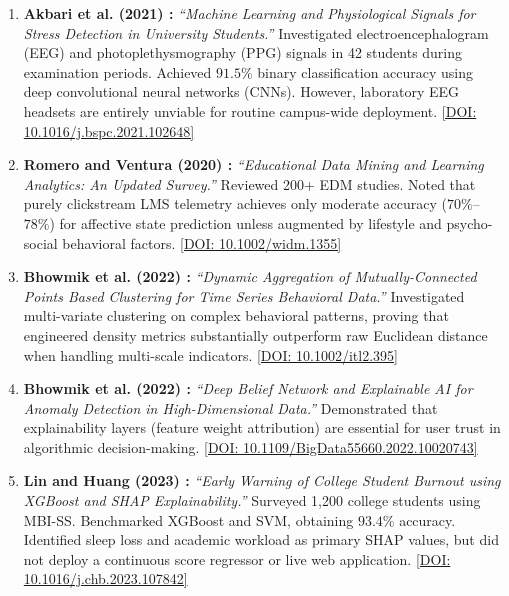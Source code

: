 \documentclass[12pt,a4paper,oneside]{report}
\begin{document}
\begin{enumerate}
    \item \textbf{Akbari et al. (2021) \cite{akbari2021}:} \emph{``Machine Learning and Physiological Signals for Stress Detection in University Students.''} Investigated electroencephalogram (EEG) and photoplethysmography (PPG) signals in 42 students during examination periods. Achieved $91.5\%$ binary classification accuracy using deep convolutional neural networks (CNNs). However, laboratory EEG headsets are entirely unviable for routine campus-wide deployment. \href{https://doi.org/10.1016/j.bspc.2021.102648}{[DOI: 10.1016/j.bspc.2021.102648]}

    \item \textbf{Romero and Ventura (2020) \cite{romero2020}:} \emph{``Educational Data Mining and Learning Analytics: An Updated Survey.''} Reviewed 200+ EDM studies. Noted that purely clickstream LMS telemetry achieves only moderate accuracy ($70\%$--$78\%$) for affective state prediction unless augmented by lifestyle and psycho-social behavioral factors. \href{https://doi.org/10.1002/widm.1355}{[DOI: 10.1002/widm.1355]}

    \item \textbf{Bhowmik et al. (2022) \cite{bhowmik2022dynamite}:} \emph{``Dynamic Aggregation of Mutually-Connected Points Based Clustering for Time Series Behavioral Data.''} Investigated multi-variate clustering on complex behavioral patterns, proving that engineered density metrics substantially outperform raw Euclidean distance when handling multi-scale indicators. \href{https://doi.org/10.1002/itl2.395}{[DOI: 10.1002/itl2.395]}

    \item \textbf{Bhowmik et al. (2022) \cite{bhowmik2022dbnex}:} \emph{``Deep Belief Network and Explainable AI for Anomaly Detection in High-Dimensional Data.''} Demonstrated that explainability layers (feature weight attribution) are essential for user trust in algorithmic decision-making. \href{https://doi.org/10.1109/BigData55660.2022.10020743}{[DOI: 10.1109/BigData55660.2022.10020743]}

    \item \textbf{Lin and Huang (2023) \cite{lin2023}:} \emph{``Early Warning of College Student Burnout using XGBoost and SHAP Explainability.''} Surveyed 1,200 college students using MBI-SS. Benchmarked XGBoost and SVM, obtaining $93.4\%$ accuracy. Identified sleep loss and academic workload as primary SHAP values, but did not deploy a continuous score regressor or live web application. \href{https://doi.org/10.1016/j.chb.2023.107842}{[DOI: 10.1016/j.chb.2023.107842]}


\end{enumerate}
\end{document}
